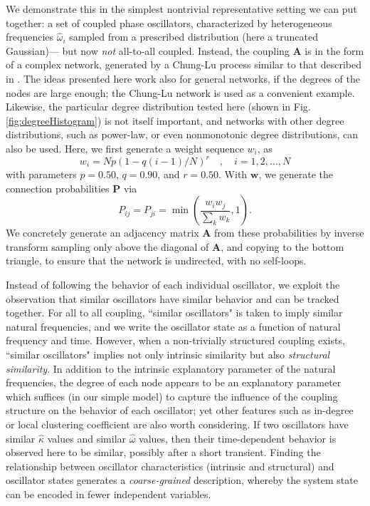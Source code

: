 \documentclass[numbers]{frontiersSCNS}
\renewcommand{\vec}[1]{\bm{#1}}
\newcommand{\mat}[1]{{\mathbf{#1}}}
\newcommand{\degree}{\kappa}
\newcommand{\figRef}[1]{Fig. \ref{fig:#1}}
\newcommand{\wordDefn}[1]{\emph{#1}}
\newcommand{\chungLuPVal}{0.50}
\newcommand{\chungLuQVal}{0.90}
\newcommand{\chungLuRVal}{0.50}
\begin{document}
We demonstrate this in the simplest nontrivial representative setting we can put together:
a set of coupled phase oscillators, characterized by heterogeneous frequencies $\hat\omega_i$
sampled from a prescribed distribution (here a truncated Gaussian)---%
but now \emph{not} all-to-all coupled.
%
Instead, the coupling $\mat{A}$ is in the form of a complex network,
generated by a Chung-Lu process similar to that described in \cite{Laing2012a,Chung2002}.
%
The ideas presented here work also for general networks,
if the degrees of the nodes are large enough;
the Chung-Lu network is used as a convenient example.
%
Likewise, the particular degree distribution tested here
(shown in \figRef{degreeHistogram})
is not itself important,
and networks with other degree distributions,
such as power-law,
or even nonmonotonic degree distributions,
can also be used.
%
%
Here, we first generate a weight sequence $w_i$, as
\begin{equation}
    \label{eqn:chungLuWeights}
    w_i = N  p  (1 - q (i-1) / N)^r\quad,\quad i=1,2,\ldots,N
\end{equation}
with parameters $p=\chungLuPVal$, $q=\chungLuQVal$, and $r=\chungLuRVal$.
%
With $\vec w$, we generate the connection probabilities $\mat P$ via
\begin{equation}
    \label{eqn:chungLuProbabilities}
    P_{ij} = P_{ji} = \min\left( \frac{w_i w_j}{\sum_k w_k}, 1 \right).
\end{equation}
%
We concretely generate an adjacency matrix $\mat A$ from these probabilities
by inverse transform sampling only above the diagonal of $\mat A$, and copying
to the bottom triangle, to ensure that the network is undirected,
with no self-loops.


%
%
%
%
%
%
%
%
%
%
%


Instead of following the behavior of each individual oscillator,
we exploit the observation that similar oscillators have
similar behavior and can be tracked together.
%
For all to all coupling, ``similar oscillators" is taken to imply similar natural frequencies,
and we write the oscillator state as a function of natural frequency \cite{Moon2006} and time.
%
However,
when a non-trivially structured coupling exists,
``similar oscillators" implies not only intrinsic similarity
but also {\em structural similarity}.
%
In addition to the intrinsic explanatory parameter of the natural frequencies,
the degree of each node appears to be an explanatory parameter
which suffices  (in our simple model) to capture the influence of the coupling structure
on the behavior of each oscillator;
yet other features such as in-degree or local clustering coefficient
are also worth considering.
%
If two oscillators have similar $\hat\degree$ values and similar $\hat\omega$ values, then their time-dependent behavior
is observed here to be similar, possibly after a short transient.
%
Finding the relationship between oscillator characteristics (intrinsic and structural)
and oscillator states generates a \wordDefn{coarse-grained} description,
whereby the system state can be encoded in fewer independent variables.
\end{document}
